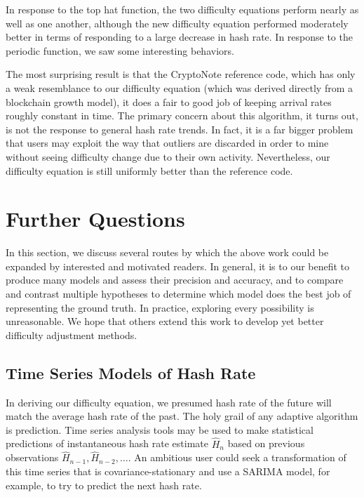 \documentclass[12pt,english]{mrl}
\theoremstyle{definition}
\numberwithin{equation}{section}
\numberwithin{figure}{section}
\numberwithin{equation}{section}
\numberwithin{equation}{section}
\numberwithin{figure}{section}
\begin{document}
In response to the top hat function, the two difficulty equations perform nearly as well as one another, although the new difficulty equation performed moderately better in terms of responding to a large decrease in hash rate.  In response to the periodic function, we saw some interesting behaviors.

The most surprising result is that the CryptoNote reference code, which has only a weak resemblance to our difficulty equation (which was derived directly from a blockchain growth model), it does a fair to good job of keeping arrival rates roughly constant in time. The primary concern about this algorithm, it turns out, is not the response to general hash rate trends. In fact, it is a far bigger problem that users may exploit the way that outliers are discarded in order to mine without seeing difficulty change due to their own activity. Nevertheless, our difficulty equation is still uniformly better than the reference code.

\section{Further Questions}\label{furtherQuestions}

In this section, we discuss several routes by which the above work could be expanded by interested and motivated readers. In general, it is to our benefit to produce many models and assess their precision and accuracy, and to compare and contrast multiple hypotheses to determine which model does the best job of representing the ground truth. In practice, exploring every possibility is unreasonable. We hope that others extend this work to develop yet better difficulty adjustment methods.

\subsection{Time Series Models of Hash Rate}\label{timeSeries}
In deriving our difficulty equation, we presumed hash rate of the future will match the average hash rate of the past. The holy grail of any adaptive algorithm is prediction. Time series analysis tools may be used to make statistical predictions of instantaneous hash rate estimate $\hat{H}_{n}$ based on previous observations $\hat{H}_{n-1}, \hat{H}_{n-2}, \ldots$. An ambitious user could seek a transformation of this time series that is covariance-stationary and use a SARIMA model, for example, to try to predict the next hash rate. 
\end{document}
